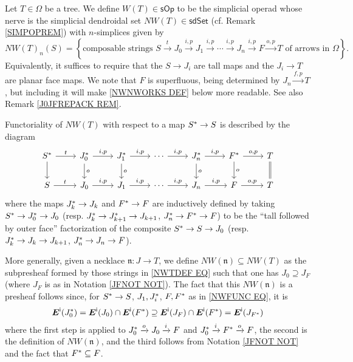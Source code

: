 \documentclass{hha}
\theoremstyle{definition} %
\begin{document}
\begin{definition}\label{NWTNS DEF}
	Let $T \in \Omega$ be a tree.
	We define 
	$W(T) \in \mathsf{sOp}$
	to be the simplicial operad whose nerve is the 
	simplicial dendroidal set 
	$NW(T) \in \mathsf{sdSet}$
	(cf. Remark \ref{SIMPOPREM})
	with $n$-simplices given by
\begin{equation}\label{NWTDEF EQ}
	NW(T)_n(S)
=
	\left\{
	\text{composable strings }
	S \xrightarrow{t} 
	J_0 \xrightarrow{i,p} 
	J_1 \xrightarrow{i,p} 
	\cdots \xrightarrow{i,p}
	J_n \xrightarrow{i,p}
	F \xrightarrow{o,p}
	T
	\text{ of arrows in $\Omega$}
	\right\}.
\end{equation}
	Equivalently, 
	it suffices to require that the
	$S \to J_i$ are tall maps
	and the $J_i \to T$ are planar face maps.
	We note that $F$ is superfluous, 
	being determined by $J_n \xrightarrow{f,p} T$,
	but including it will make \eqref{NWNWORKS DEF} 
	below more readable.
	See also Remark \ref{J0JFREPACK REM}.

	Functoriality of 
	$NW(T)$
	with respect to a map $S^{\**} \to S$
	is described by the diagram
\begin{equation}\label{NWFUNC EQ}
\begin{tikzcd}
	S^{\**} \ar{r}{t} \ar{d}
&
	J^{\**}_0 \ar{r}{i,p} \ar{d}{o}
&
	J^{\**}_1 \ar{r}{i,p} \ar{d}{o}
&
	\cdots \ar{r}{i,p}
&
	J^{\**}_n \ar{r}{i,p} \ar{d}{o}
&
	F^{\**} \ar{r}{o,p} \ar{d}{o}
&
	T \ar[equal]{d}
\\
	S \ar{r}{t} 
&
	J_0 \ar{r}{i,p}
&
	J_1 \ar{r}{i,p}
&
	\cdots \ar{r}{i,p}
&
	J_n \ar{r}{i,p}
&
	F \ar{r}{o,p}
&
	T	
\end{tikzcd}
\end{equation}
	where the maps $J^{\**}_k \to J_k$ and 
	$F^{\**} \to F$
	are inductively defined by taking
	$S^{\**} \to J^{\**}_0 \to J_0$
	(resp. $J^{\**}_k \to J^{\**}_{k+1} \to J_{k+1}$,
	$J^{\**}_n \to F^{\**} \to F$)
	to be the ``tall followed by outer face''
	factorization of the composite
	$S^{\**} \to S \to J_0$
	(resp. $J^{\**}_k \to J_{k} \to J_{k+1}$,
	$J^{\**}_n \to J_n \to F$).

	More generally, 
	given a necklace $\mathfrak{n}\colon J \to T$,
	we define
	$NW(\mathfrak{n}) \subseteq NW(T)$
	as the subpresheaf formed by those strings in 
	\eqref{NWTDEF EQ} such that
	one has $J_0 \supseteq J_{F}$
	(where $J_{F}$ is as in Notation \ref{JFNOT NOT}).
	The fact that this $NW(\mathfrak{n})$ is a presheaf follows 
	since, for $S^{\**} \to S$, 
	$J_1,J_i^{\**}$, $F,F^{\**}$ as in \eqref{NWFUNC EQ},
	it is
\begin{equation}\label{NWNWORKS DEF}
	\boldsymbol{E}^{\mathsf{i}}(J^{\**}_0)
=
	\boldsymbol{E}^{\mathsf{i}}(J_0)
	\cap
	\boldsymbol{E}^{\mathsf{i}}(F^{\**})
\supseteq
	\boldsymbol{E}^{\mathsf{i}}(J_{F})
	\cap
	\boldsymbol{E}^{\mathsf{i}}(F^{\**})
=
	\boldsymbol{E}^{\mathsf{i}}(J_{F^{\**}})
\end{equation}
where the first step is 
\cite[Lemma 2.5]{BP_edss}
applied to 
$J^{\**}_0 \xrightarrow{o} J_0 \xrightarrow{i} F$
and 
$J^{\**}_0 \xrightarrow{i} 
F^{\**} \xrightarrow{o}
F$,
the second is the definition of $NW(\mathfrak{n})$,
and the third follows from Notation \ref{JFNOT NOT}
and the fact that $F^{\**} \subseteq F$.
\end{definition}
\end{document}
